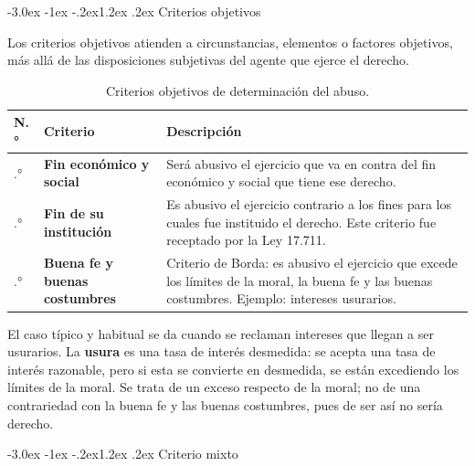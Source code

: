 \documentclass[12pt,oneside]{book}
\makeatletter
\renewcommand\section{\@startsection{section}{1}{\z@}%
  {-3.0ex \@plus -1ex \@minus -.2ex}{1.2ex \@plus .2ex}%
  {\normalfont\large\bfseries\color{acento}}}
\makeatother
\begin{document}
\section{Criterios objetivos}

Los criterios objetivos atienden a circunstancias, elementos o factores objetivos, más allá de las disposiciones subjetivas del agente que ejerce el derecho.

\begin{table}[H]
\centering
\begin{tabularx}{\textwidth}{
    >{\centering\arraybackslash}p{1cm}
    >{\raggedright\arraybackslash}p{4.2cm}
    >{\raggedright\arraybackslash}X
}
\toprule
\textbf{N.°} & \textbf{Criterio} & \textbf{Descripción} \\
\midrule
1.° & \textbf{Fin económico y social} & Será abusivo el ejercicio que va en contra del fin económico y social que tiene ese derecho. \\
\addlinespace
2.° & \textbf{Fin de su institución} & Es abusivo el ejercicio contrario a los fines para los cuales fue instituido el derecho. Este criterio fue receptado por la Ley 17.711. \\
\addlinespace
3.° & \textbf{Buena fe y buenas costumbres} & Criterio de Borda: es abusivo el ejercicio que excede los límites de la moral, la buena fe y las buenas costumbres. Ejemplo: intereses usurarios. \\
\bottomrule
\end{tabularx}
\caption{Criterios objetivos de determinación del abuso.}
\end{table}

\begin{ejemplo}
El caso típico y habitual se da cuando se reclaman intereses que llegan a ser usurarios. La \textbf{usura} es una tasa de interés desmedida: se acepta una tasa de interés razonable, pero si esta se convierte en desmedida, se están excediendo los límites de la moral. Se trata de un exceso respecto de la moral; no de una contrariedad con la buena fe y las buenas costumbres, pues de ser así no sería derecho.
\end{ejemplo}

\section{Criterio mixto}
\end{document}
